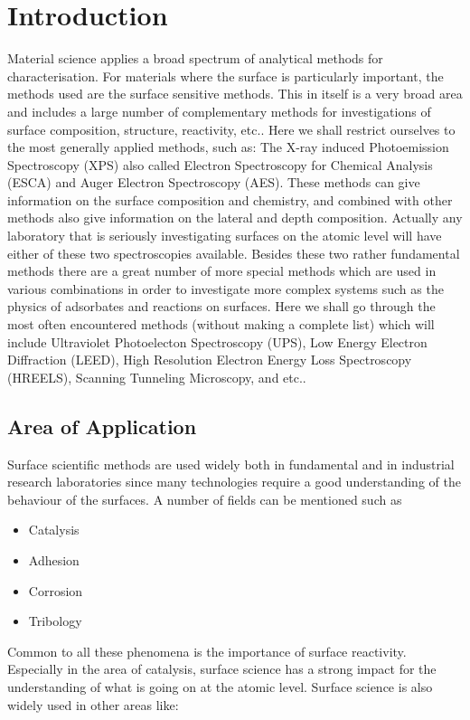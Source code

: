 \chapter{Introduction}
Material science applies a broad spectrum of analytical methods for characterisation. For materials where the surface is particularly important, the methods used are the surface sensitive methods. This in itself is a very broad area and includes a large number of complementary methods for investigations of surface composition, structure, reactivity, etc.. Here we shall restrict ourselves to the most generally applied methods, such as: The X-ray induced Photoemission Spectroscopy (XPS) also called Electron Spectroscopy for Chemical Analysis (ESCA) and Auger Electron Spectroscopy (AES). These methods can give information on the surface composition and chemistry, and combined with other methods also give information on the lateral and depth composition. Actually any laboratory that is seriously investigating surfaces on the atomic level will have either of these two spectroscopies available. Besides these two rather fundamental methods there are a great number of more special methods which are used in various combinations in order to investigate more complex systems such as the physics of adsorbates and reactions on surfaces. Here we shall go through the most often encountered methods (without making a complete list) which will include Ultraviolet Photoelecton Spectroscopy (UPS), Low Energy Electron Diffraction (LEED), High Resolution Electron Energy Loss Spectroscopy (HREELS), Scanning Tunneling Microscopy, and etc.. 

\section{Area of Application}
Surface scientific methods are used widely both in fundamental and in industrial research laboratories since many technologies require a good understanding of the behaviour of the surfaces. A number of fields can be mentioned such as

\begin{itemize}
\item Catalysis
\item Adhesion
\item Corrosion
\item Tribology
\end{itemize}

Common to all these phenomena is the importance of surface reactivity. Especially in the area of catalysis, surface science has a strong impact for the understanding of what is going on at the atomic level. Surface science is also widely used in other areas like:

